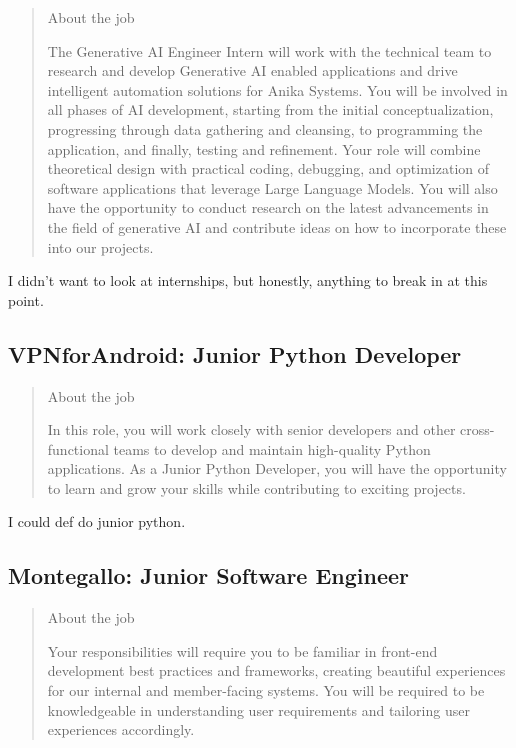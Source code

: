 \documentclass[
	letterpaper, %
	12pt, %
]{CSSullivanBusinessReport}
\begin{document}
\begin{quote}
	About the job
	
	The Generative AI Engineer Intern will work with the technical team to research and develop Generative AI enabled applications and drive intelligent automation solutions for Anika Systems. You will be involved in all phases of AI development, starting from the initial conceptualization, progressing through data gathering and cleansing, to programming the application, and finally, testing and refinement. Your role will combine theoretical design with practical coding, debugging, and optimization of software applications that leverage Large Language Models. You will also have the opportunity to conduct research on the latest advancements in the field of generative AI and contribute ideas on how to incorporate these into our projects.

\end{quote}

I didn't want to look at internships, but honestly, anything to break in at this point. 


\subsection[VPNforAndroid]{VPNforAndroid: Junior Python Developer}

\begin{quote}
	About the job
	
	In this role, you will work closely with senior developers and other cross-functional teams to develop and maintain high-quality Python applications. As a Junior Python Developer, you will have the opportunity to learn and grow your skills while contributing to exciting projects.

\end{quote}

I could def do junior python.


\subsection[Montegallo]{Montegallo: Junior Software Engineer}

\begin{quote}
	About the job
	
	Your responsibilities will require you to be familiar in front-end development best practices and frameworks, creating beautiful experiences for our internal and member-facing systems.
	You will be required to be knowledgeable in understanding user requirements and tailoring user experiences accordingly.

\end{quote}
\end{document}
